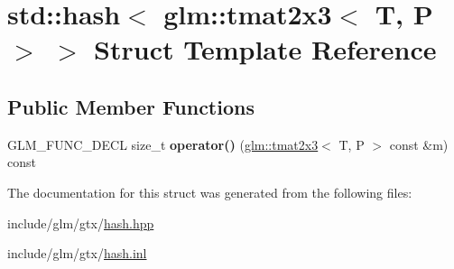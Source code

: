 \hypertarget{structstd_1_1hash_3_01glm_1_1tmat2x3_3_01T_00_01P_01_4_01_4}{}\section{std\+:\+:hash$<$ glm\+:\+:tmat2x3$<$ T, P $>$ $>$ Struct Template Reference}
\label{structstd_1_1hash_3_01glm_1_1tmat2x3_3_01T_00_01P_01_4_01_4}
\subsection*{Public Member Functions}
\begin{DoxyCompactItemize}
\item 
\mbox{\label{structstd_1_1hash_3_01glm_1_1tmat2x3_3_01T_00_01P_01_4_01_4_aedb29189bf31b4deaf354b9939a06963}} 
G\+L\+M\+\_\+\+F\+U\+N\+C\+\_\+\+D\+E\+CL size\+\_\+t {\bfseries operator()} (\hyperlink{structglm_1_1tmat2x3}{glm\+::tmat2x3}$<$ T, P $>$ const \&m) const
\end{DoxyCompactItemize}


The documentation for this struct was generated from the following files\+:\begin{DoxyCompactItemize}
\item 
include/glm/gtx/\hyperlink{hash_8hpp}{hash.\+hpp}\item 
include/glm/gtx/\hyperlink{hash_8inl}{hash.\+inl}\end{DoxyCompactItemize}
